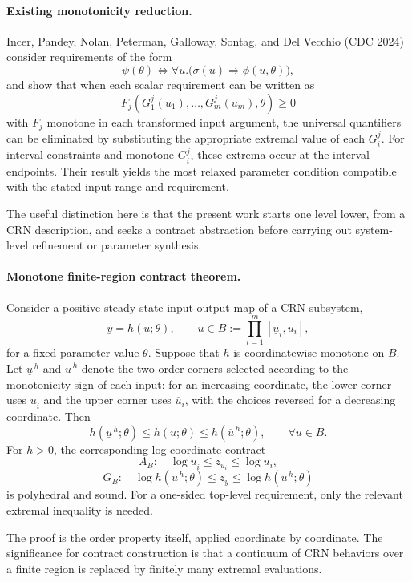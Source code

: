 \paragraph{Existing monotonicity reduction.}
Incer, Pandey, Nolan, Peterman, Galloway, Sontag, and Del Vecchio (CDC 2024)
consider requirements of the form
\[
\psi(\theta)
\Longleftrightarrow
\forall u.\bigl(\sigma(u)\Longrightarrow\phi(u,\theta)\bigr),
\]
and show that when each scalar requirement can be written as
\[
F_j\!\left(G^j_1(u_1),\ldots,G^j_m(u_m),\theta\right)\ge0
\]
with $F_j$ monotone in each transformed input argument, the universal
quantifiers can be eliminated by substituting the appropriate extremal value
of each $G_i^j$. For interval constraints and monotone $G_i^j$, these extrema
occur at the interval endpoints. Their result yields the most relaxed
parameter condition compatible with the stated input range and requirement.

The useful distinction here is that the present work starts one level lower,
from a CRN description, and seeks a contract abstraction before carrying out
system-level refinement or parameter synthesis.

\paragraph{Monotone finite-region contract theorem.}
Consider a positive steady-state input-output map of a CRN subsystem,
\[
y=h(u;\theta),\qquad
u\in B:=\prod_{i=1}^m[\underline u_i,\overline u_i],
\]
for a fixed parameter value $\theta$. Suppose that $h$ is coordinatewise
monotone on $B$. Let $\underline u^{\,h}$ and $\overline u^{\,h}$ denote the
two order corners selected according to the monotonicity sign of each input:
for an increasing coordinate, the lower corner uses $\underline u_i$ and the
upper corner uses $\overline u_i$, with the choices reversed for a decreasing
coordinate. Then
\[
h(\underline u^{\,h};\theta)
\le h(u;\theta)
\le h(\overline u^{\,h};\theta),
\qquad \forall u\in B.
\]
For $h>0$, the corresponding log-coordinate contract
\[
A_B:\quad
\log\underline u_i\le z_{u_i}\le\log\overline u_i,
\]
\[
G_B:\quad
\log h(\underline u^{\,h};\theta)
\le z_y
\le
\log h(\overline u^{\,h};\theta)
\]
is polyhedral and sound. For a one-sided top-level requirement, only the
relevant extremal inequality is needed.

The proof is the order property itself, applied coordinate by coordinate.
The significance for contract construction is that a continuum of CRN
behaviors over a finite region is replaced by finitely many extremal
evaluations.

